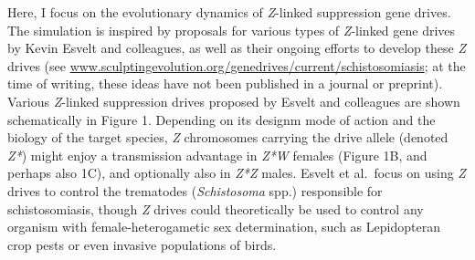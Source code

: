 \documentclass[]{rsos}%
\begin{document}
Here, I focus on the evolutionary dynamics of \emph{Z}-linked
suppression gene drives. The simulation is inspired by proposals for
various types of \emph{Z}-linked gene drives by Kevin Esvelt and
colleagues, as well as their ongoing efforts to develop these \emph{Z}
drives (see
\href{}{www.sculptingevolution.org/genedrives/current/schistosomiasis};
at the time of writing, these ideas have not been published in a journal
or preprint). Various \emph{Z}-linked suppression drives proposed by
Esvelt and colleagues are shown schematically in Figure 1. Depending on
its designm mode of action and the biology of the target species,
\emph{Z} chromosomes carrying the drive allele (denoted \emph{Z*}) might
enjoy a transmission advantage in \emph{Z*W} females (Figure 1B, and
perhaps also 1C), and optionally also in \emph{Z*Z} males. Esvelt et
al.~focus on using \emph{Z} drives to control the trematodes
(\emph{Schistosoma} spp.) responsible for schistosomiasis, though
\emph{Z} drives could theoretically be used to control any organism with
female-heterogametic sex determination, such as Lepidopteran crop pests
or even invasive populations of birds.
\end{document}
